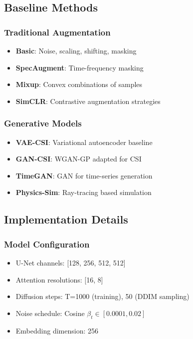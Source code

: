 \documentclass[journal]{IEEEtran}
\begin{document}
\subsection{Baseline Methods}

\subsubsection{Traditional Augmentation}
\begin{itemize}
\item \textbf{Basic}: Noise, scaling, shifting, masking
\item \textbf{SpecAugment}: Time-frequency masking
\item \textbf{Mixup}: Convex combinations of samples
\item \textbf{SimCLR}: Contrastive augmentation strategies
\end{itemize}

\subsubsection{Generative Models}
\begin{itemize}
\item \textbf{VAE-CSI}: Variational autoencoder baseline
\item \textbf{GAN-CSI}: WGAN-GP adapted for CSI
\item \textbf{TimeGAN}: GAN for time-series generation
\item \textbf{Physics-Sim}: Ray-tracing based simulation
\end{itemize}

\subsection{Implementation Details}

\subsubsection{Model Configuration}
\begin{itemize}
\item U-Net channels: [128, 256, 512, 512]
\item Attention resolutions: [16, 8]
\item Diffusion steps: T=1000 (training), 50 (DDIM sampling)
\item Noise schedule: Cosine $\beta_t \in [0.0001, 0.02]$
\item Embedding dimension: 256
\end{itemize}
\end{document}
